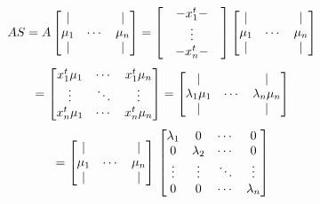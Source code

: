 \documentclass[12pt,journal]{IEEEtran}
\begin{document}
    \[
        A S = A
        \begin{bmatrix}
              |   &        &   |  \\
            \mu_1 & \cdots & \mu_n\\
              |   &        &   |  \\
        \end{bmatrix}
        =
        \begin{bmatrix}
             & - x_1^t - &\\
             &  \vdots   &\\
             & - x_n^t - &\\
        \end{bmatrix}
        \begin{bmatrix}
              |   &        &   |  \\
            \mu_1 & \cdots & \mu_n\\
              |   &        &   |  \\
        \end{bmatrix}\\
    \]
    \[
        =
        \begin{bmatrix}
            x_1^t \mu_1 & \cdots & x_1^t \mu_n\\
               \vdots   & \ddots &   \vdots   \\
            x_n^t \mu_1 & \cdots & x_n^t \mu_n\\
        \end{bmatrix}
        =
        \begin{bmatrix}
                    |       &        &         |      \\
            \lambda_1 \mu_1 & \cdots & \lambda_n \mu_n\\
                    |       &        &         |      \\
        \end{bmatrix}\\
    \]
    \[
        =
        \begin{bmatrix}
               |  &        &   |  \\
            \mu_1 & \cdots & \mu_n\\
               |  &        &   |  \\
        \end{bmatrix}\\
        \begin{bmatrix}
            \lambda_1 &      0    & \cdots &   0 \\
                0     & \lambda_2 & \cdots &   0 \\
              \vdots  &   \vdots  & \ddots & \vdots \\
                0     &      0    & \cdots & \lambda_n \\
        \end{bmatrix}\\
    \]
\end{document}
